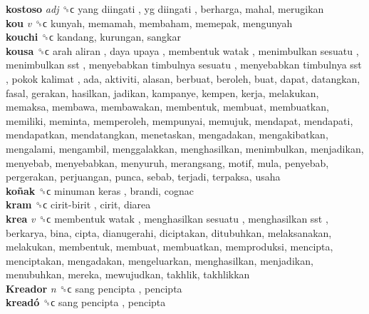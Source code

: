 \textbf{kostoso} \emph{adj}  ␝ϲ   yang diingati ,  yg diingati , berharga, mahal, merugikan  \\
\textbf{kou} \emph{v}  ␝ϲ  kunyah, memamah, membaham, memepak, mengunyah  \\
\textbf{kouchi} ␝ϲ  kandang, kurungan, sangkar  \\
\textbf{kousa} ␝ϲ   arah aliran ,  daya upaya ,  membentuk watak ,  menimbulkan sesuatu ,  menimbulkan sst ,  menyebabkan timbulnya sesuatu ,  menyebabkan timbulnya sst ,  pokok kalimat , ada, aktiviti, alasan, berbuat, beroleh, buat, dapat, datangkan, fasal, gerakan, hasilkan, jadikan, kampanye, kempen, kerja, melakukan, memaksa, membawa, membawakan, membentuk, membuat, membuatkan, memiliki, meminta, memperoleh, mempunyai, memujuk, mendapat, mendapati, mendapatkan, mendatangkan, menetaskan, mengadakan, mengakibatkan, mengalami, mengambil, menggalakkan, menghasilkan, menimbulkan, menjadikan, menyebab, menyebabkan, menyuruh, merangsang, motif, mula, penyebab, pergerakan, perjuangan, punca, sebab, terjadi, terpaksa, usaha  \\
\textbf{koñak} ␝ϲ   minuman keras , brandi, cognac  \\
\textbf{kram} ␝ϲ   cirit-birit , cirit, diarea  \\
\textbf{krea} \emph{v}  ␝ϲ   membentuk watak ,  menghasilkan sesuatu ,  menghasilkan sst , berkarya, bina, cipta, dianugerahi, diciptakan, ditubuhkan, melaksanakan, melakukan, membentuk, membuat, membuatkan, memproduksi, mencipta, menciptakan, mengadakan, mengeluarkan, menghasilkan, menjadikan, menubuhkan, mereka, mewujudkan, takhlik, takhlikkan  \\
\textbf{Kreador} \emph{n}  ␝ϲ   sang pencipta , pencipta  \\
\textbf{kreadó} ␝ϲ   sang pencipta , pencipta  \\
